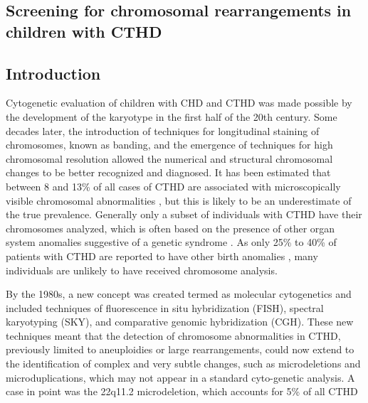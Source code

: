 \begin{refsection}
\chapter{Screening for chromosomal rearrangements in children with CTHD}

\label{Chapter3} %


\section{Introduction}
Cytogenetic evaluation of children with CHD and CTHD was made possible by the development of the karyotype in the first half of the 20th century. Some decades later, the introduction of techniques for longitudinal staining of chromosomes, known as banding, and the emergence of techniques for high chromosomal resolution allowed the numerical and structural chromosomal changes to be better recognized and diagnosed. It has been estimated that between 8 and 13\% of all cases of CTHD are associated with microscopically visible chromosomal abnormalities \cite{nora1993causes, ferencz1989congenital}, but this is likely to be an underestimate of the true prevalence. Generally only a subset of individuals with CTHD have their chromosomes analyzed, which is often based on the presence of other organ system anomalies suggestive of a genetic syndrome \cite{nora1993causes, hartman2011contribution, johnson1997chromosome}. As only 25\% to 40\% of patients with CTHD are reported to have other birth anomalies \cite{bernstein2004evaluation, richards2008cryptic}, many individuals are unlikely to have received chromosome analysis. 

By the 1980s, a new concept was created termed as molecular cytogenetics and included techniques of fluorescence in situ hybridization (FISH), spectral karyotyping (SKY), and comparative genomic hybridization (CGH). These new techniques meant that the detection of chromosome abnormalities in CTHD, previously limited to aneuploidies or large rearrangements, could now extend to the identification of complex and very subtle changes, such as microdeletions and microduplications, which may not appear in a standard cyto-genetic analysis. A case in point was the 22q11.2 microdeletion, which accounts for 5\% of all CTHD \cite{zweier2007human}


\end{refsection}
